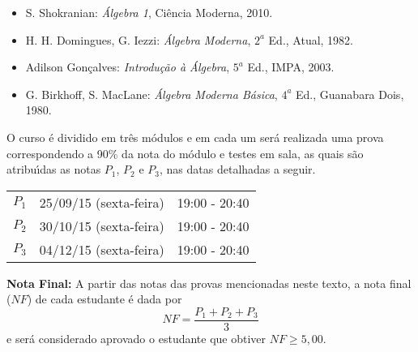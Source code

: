 \documentclass[12pt]{article}
\begin{document}
\begin{itemize}

\item S. Shokranian: {\it {\'A}lgebra 1}, Ci{\^e}ncia Moderna, 2010.

\item H. H. Domingues, G. Iezzi: {\it {\'A}lgebra Moderna}, $2^a$
  Ed., Atual, 1982.

\item Adilson Gon{\c c}alves: {\it Introdu{\c c}{\~a}o {\`a} {\'A}lgebra}, $5^a$ Ed., IMPA,
  2003.

\item G. Birkhoff, S. MacLane: {\it {\'A}lgebra Moderna B{\'a}sica}, $4^a$ Ed.,
  Guanabara Dois, 1980.

\end{itemize}

 O curso \'{e} dividido em tr\^{e}s
m\'{o}dulos e em cada um ser{\'a} realizada uma prova correspondendo a 90\% da nota do m\'odulo e testes em sala, as quais s\~{a}o atribu\'{\i}das as notas $P_1$, $P_2$ e $P_3$, nas datas detalhadas a seguir.

\begin{center}
    \begin{tabular}{c|c|c}
        \hline\hline
        \hspace{1cm}{\bf Prova}\hspace{1cm} & \hspace{3cm}{\bf Data}\hspace{3cm} & \hspace{1.7cm}{\bf Hor\'{a}rio}\hspace{1.7cm} \\
        \hline\hline
        $P_1$ & 25/09/15 (sexta-feira) \phantom{x} & 19:00 - 20:40 \\
        \hline
        $P_2$ & 30/10/15 (sexta-feira) \phantom{x} & 19:00 - 20:40 \\
        \hline
        $P_3$ & 04/12/15 (sexta-feira) \phantom{x} & 19:00 - 20:40 \\
        \hline\hline
    \end{tabular}
\end{center}

{\bf \noindent Nota Final:} A partir das notas das provas mencionadas neste texto, a nota final ($NF$) de cada estudante \'{e} dada
por
\vspace{-0.15cm}
\[
NF = \frac{ P_1 + P_2 + P_3}{3}
\]
e ser\'{a} considerado aprovado o estudante que obtiver $NF \geq 5,00$.
\end{document}
